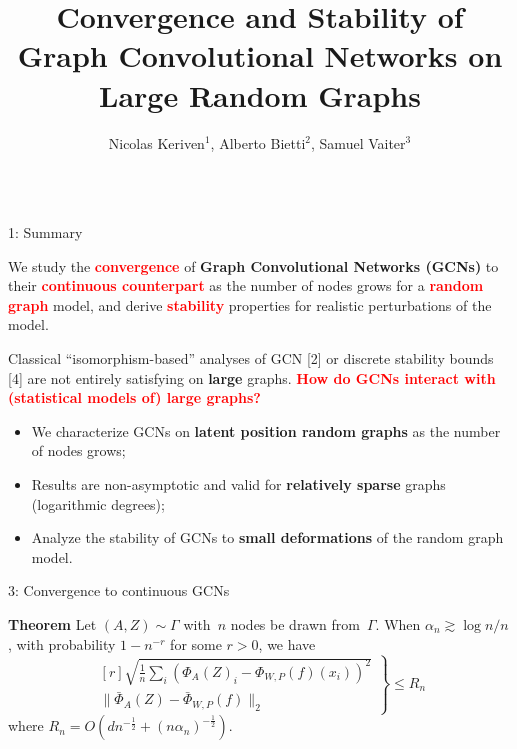 \documentclass[final,dvipsnames]{beamer}
\title{Convergence and Stability of Graph Convolutional Networks on Large Random Graphs}
\author{Nicolas Keriven$^1$, Alberto Bietti$^2$, Samuel Vaiter$^3$}
\institute{$^1$CNRS, GIPSA-lab, Grenoble\quad $^2$NYU Center for Data Science, New York\quad $^3$CNRS, IMB, Dijon
}
\newcommand{\vsp}{\vspace{10pt}}
\newcommand{\myemphh}[1]{\textbf{\textcolor{red}{#1}}}
\newcommand{\mycolbacksum}[1]{
\hspace*{.01\linewidth}\begin{minipage}{.96\linewidth}
\begin{mdframed}[backgroundcolor=blue!10,linewidth=0pt]
\vsp
#1
\end{mdframed}
\end{minipage}
}
\newcommand{\mycolback}[1]{
\hspace*{.01\linewidth}\begin{minipage}{.96\linewidth}
\begin{mdframed}[backgroundcolor=blue!10,linewidth=0pt]
\vsp
#1
\vsp
\end{mdframed}
\end{minipage}
}
\newcommand{\mycolbackwhite}[1]{
\hspace*{.01\linewidth}\begin{minipage}{.96\linewidth}
\begin{mdframed}[backgroundcolor=white,linewidth=1pt]
\vsp
#1
\vsp
\end{mdframed}
\end{minipage}
}
\begin{document}
\begin{frame}{}
\vspace{-40pt}
\begin{columns}[t]
\begin{column}{0.25\linewidth}
\begin{myalertblock}{1: Summary}
\begin{center}
\mycolbacksum{We study the \myemphh{convergence} of \textbf{Graph Convolutional Networks (GCNs)} to their \myemphh{continuous counterpart} as the number of nodes grows for a \myemphh{random graph} model, and derive \myemphh{stability} properties for realistic perturbations of the model.}
\end{center}
\vsp 

\hspace*{.01\linewidth}\begin{minipage}{.96\linewidth}
\mycolbackwhite{
Classical ``isomorphism-based'' analyses of GCN [2] or discrete stability bounds [4] are not entirely satisfying on \textbf{large} graphs. \myemphh{How do GCNs interact with (statistical models of) large graphs?}
}
\end{minipage}
\vsp

\begin{itemize}
\item We characterize GCNs on \textbf{latent position random graphs} as the number of nodes grows;
\item Results are non-asymptotic and valid for \textbf{relatively sparse} graphs (logarithmic degrees);
\item Analyze the stability of GCNs to \textbf{small deformations} of the random graph model.
\end{itemize}

\end{myalertblock}
\vsp 

\begin{myalertblock}{3: Convergence to continuous GCNs}


\vspace{0.3cm}
\mycolback{
\textbf{Theorem}
  Let $(A,Z) \sim \Gamma$ with~$n$ nodes be drawn from~$\Gamma$. When $\alpha_n \gtrsim \log n/n$, with probability $1-n^{-r}$ for some $r>0$, we have
  \vsp
  \begin{equation*}
\left. \begin{matrix*}[r]
\sqrt{\frac{1}{n} \sum_i (\Phi_A(Z)_i - \Phi_{W,P}(f)(x_i))^2} \\
\| \bar \Phi_A(Z) - \bar \Phi_{W,P}(f)\|_2
\end{matrix*}\right\rbrace  \leq R_n
  \end{equation*}
  \vsp
  where {\color{red}$R_n = O(d n^{-\frac12} + (n\alpha_n)^{-\frac12})$}.
}


\end{myalertblock}
\end{column}
\end{columns}
\end{frame}
\end{document}

